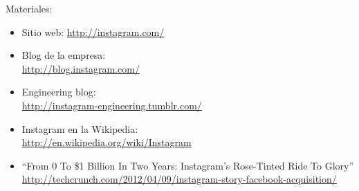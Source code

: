 \documentclass[a4paper,12pt]{article}
\begin{document}
Materiales:

\begin{itemize}
\item Sitio web: \url{http://instagram.com/}
\item Blog de la empresa: \\
  \url{http://blog.instagram.com/}
\item Engineering blog: \\
  \url{http://instagram-engineering.tumblr.com/}
\item Instagram en la Wikipedia: \\
  \url{http://en.wikipedia.org/wiki/Instagram}
\item ``From 0 To \$1 Billion In Two Years: Instagram’s Rose-Tinted Ride To Glory'' \\
  \url{http://techcrunch.com/2012/04/09/instagram-story-facebook-acquisition/}


\end{itemize}
\end{document}
